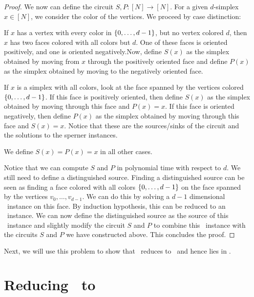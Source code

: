 \begin{proof}
	We now can define the circuit $S, P : [N] \rightarrow [N]$. For a given $d$-simplex $x \in [N]$, we consider the color of the vertices. We proceed by case distinction:
	\begin{case}{1}
		If $x$ has a vertex with every color in $\left\{0, \dots, d-1\right\}$, but no vertex colored $d$, then $x$ has two faces colored with all colors but $d$. One of these faces is oriented positively, and one is oriented negatively.Now, define $S(x)$ as the simplex obtained by moving from $x$ through the positively oriented face and define $P(x)$ as the simplex obtained by moving to the negatively oriented face.
	\end{case}
	\begin{case}{2}
		If $x$ is a simplex with all colors, look at the face spanned by the vertices colored $\left\{0, \dots, d-1\right\}$. If this face is positively oriented, then define $S(x)$ as the simplex obtained by moving through this face and $P(x) = x$. If this face is oriented negatively, then define $P(x)$ as the simplex obtained by moving through this face and $S(x) = x$. Notice that these are the sources/sinks of the circuit and the solutions to the sperner instances.
	\end{case}
	\begin{case}{3}
		We define $S(x) = P(x) = x$ in all other cases.
	\end{case}
	Notice that we can compute $S$ and $P$ in polynomial time with respect to $d$. We still need to define a distinguished source. Finding a distinguished source can be seen as finding a face colored with all colors $\left\{0, \dots, d-1\right\}$ on the face spanned by the vertices $v_0, \dots, v_{d-1}$. We can do this by solving a $d-1$ dimensional \Sperner\ instance on this face. By induction hypothesis, this can be reduced to an \EndOfLine\ instance. We can now define the distinguished source as the source of this \EndOfLine\ instance and slightly modify the circuit $S$ and $P$ to combine this \EndOfLine\ instance with the circuits $S$ and $P$ we have constructed above. This concludes the proof.
\end{proof}

Next, we will use this problem to show that \Tarskistar\ reduces to \Sperner\ and hence lies in \PPAD.

\section{Reducing \Tarskistar\ to \Sperner}
\label{sec:tarskistar_to_sperner}

